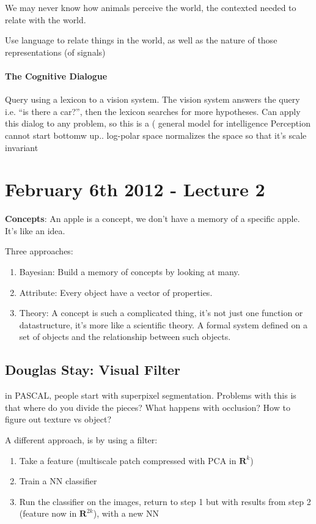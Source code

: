 We may never know how animals perceive the world, the contexted needed
to relate with the world. 

Use language to relate things in the world, as well as the nature of
those representations (of signals)

\paragraph{The Cognitive Dialogue}

Query using a lexicon to a vision system. The vision system answers
the query i.e. ``is there a car?'', then the lexicon searches for more
hypotheses. 
Can apply this dialog to any problem, so this is a ( general model for
intelligence
Perception cannot start bottomw up..
log-polar space normalizes the space so that it's scale invariant

\section{February 6th 2012 - Lecture 2}
\label{sec:lecture-2}
\textbf{Concepts}: An apple is a concept, we don't have a memory of a
specific apple. It's like an idea.

Three approaches:
\begin{enumerate}
\item Bayesian: Build a memory of concepts by looking at many.
\item Attribute: Every object have a vector of properties.
\item Theory: A concept is such a complicated thing, it's not just one
  function or datastructure, it's more like a scientific theory. A
  formal system defined on a set of objects and the relationship
  between such objects.
\end{enumerate}

\subsection{Douglas Stay: Visual Filter}
\label{sec:douglas-stay:-visual}
in PASCAL, people start with superpixel segmentation. Problems with
this is that where do you divide the pieces? What happens with
occlusion? How to figure out texture vs object?

A different approach, is by using a filter:
\begin{enumerate}
\item Take a feature (multiscale patch compressed with PCA in $\mathbf{R}^k$)
\item Train a NN classifier
\item Run the classifier on the images, return to step 1 but with
  results from step 2 (feature now in $\mathbf{R}^{2k}$), with a new NN
\end{enumerate}

